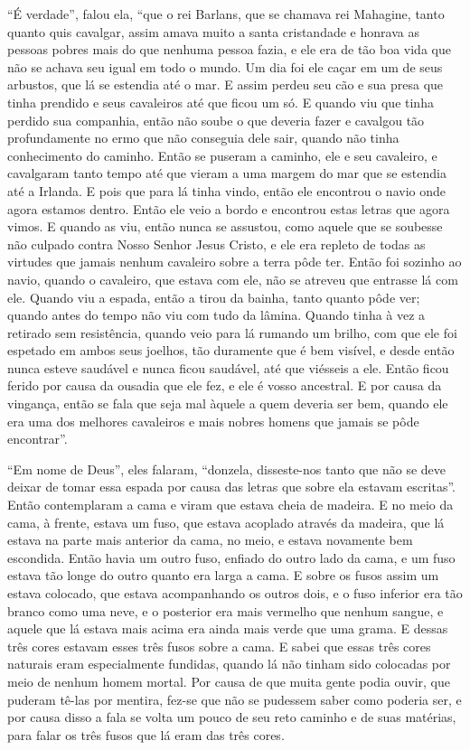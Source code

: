 “É verdade”, falou ela, “que o rei Barlans, que se chamava rei Mahagine, tanto
quanto quis cavalgar, assim amava muito a santa cristandade e honrava as
pessoas pobres mais do que nenhuma pessoa fazia, e ele era de tão boa vida que
não se achava seu igual em todo o mundo. Um dia foi ele caçar em um de seus
arbustos, que lá se estendia até o mar. E assim perdeu seu cão e sua presa que
tinha prendido e seus cavaleiros até que ficou um só. E quando viu que
tinha perdido sua companhia, então não soube o que deveria fazer e cavalgou tão
profundamente no ermo que não conseguia dele sair, quando não tinha
conhecimento do caminho. Então se puseram a caminho, ele e seu cavaleiro, e
cavalgaram tanto tempo até que vieram a uma margem do mar que se estendia até a
Irlanda. E pois que para lá tinha vindo, então ele encontrou o navio onde agora
estamos dentro. Então ele veio a bordo e encontrou estas letras que agora
vimos. E quando as viu, então nunca se assustou, como aquele que se soubesse
não culpado contra Nosso Senhor Jesus Cristo, e ele era repleto de todas as
virtudes que jamais nenhum cavaleiro sobre a terra pôde ter. Então foi
sozinho ao navio, quando o cavaleiro, que estava com ele, não se atreveu que
entrasse lá com ele. Quando viu a espada, então a tirou da bainha, tanto quanto
pôde ver; quando antes do tempo não viu com tudo da lâmina. Quando tinha à vez
a retirado sem resistência, quando veio para lá rumando um brilho, com que ele
foi espetado em ambos seus joelhos, tão duramente que é bem visível, e desde
então nunca esteve saudável e nunca ficou saudável, até que viésseis a ele.
Então ficou ferido por causa da ousadia que ele fez, e ele é vosso ancestral. E
por causa da vingança, então se fala que seja mal àquele a quem deveria ser
bem, quando ele era uma dos melhores cavaleiros e mais nobres homens que jamais
se pôde encontrar”. 

“Em nome de Deus”, eles falaram, “donzela, disseste-nos tanto que não se deve
deixar de tomar essa espada por causa das letras que sobre ela estavam
escritas”. Então contemplaram a cama e viram que estava cheia de madeira. E no
meio da cama, à frente, estava um fuso, que estava acoplado através da madeira,
que lá estava na parte mais anterior da cama, no meio, e estava novamente bem
escondida. Então havia um outro fuso, enfiado do outro lado da cama, e um fuso
estava tão longe do outro quanto era larga a cama. E sobre os fusos assim um
estava colocado, que estava acompanhando os outros dois, e o fuso inferior era
tão branco como uma neve, e o posterior era mais vermelho que nenhum sangue, e
aquele que lá estava mais acima era ainda mais verde que uma grama. E dessas
três cores estavam esses três fusos sobre a cama. E sabei que essas três cores
naturais eram especialmente fundidas, quando lá não tinham sido colocadas por
meio de nenhum homem mortal. Por causa de que muita gente podia ouvir, que
puderam tê-las por mentira, fez-se que não se pudessem saber como poderia ser,
e por causa disso a fala se volta um pouco de seu reto caminho e de suas
matérias, para falar os três fusos que lá eram das três cores. 

